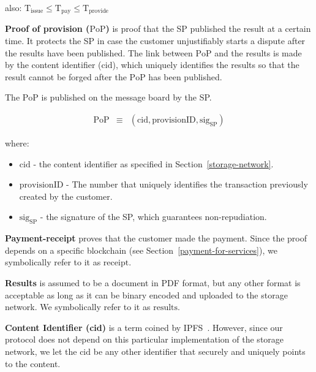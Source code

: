 \documentclass[pdftex,twocolumn,epjc3]{svjour3}
\begin{document}
{also:
\(\mathrm{T}_\mathrm{issue} \leq \mathrm{T}_\mathrm{pay} \leq \mathrm{T}_\mathrm{provide}\)


\noindent \textbf
{Proof of provision ($\mathrm{PoP}$)}\label{proof-of-provision} is proof that the SP published the result at a certain time. It protects the SP in case the customer unjustifiably starts a dispute after the results have been published. The link between $\mathrm{PoP}$ and the results is made by the content identifier ($\mathrm{cid}$), which uniquely identifies the results so that the result cannot be forged after the $\mathrm{PoP}$ has been published.

The $\mathrm{PoP}$ is published on the message board by the SP.


\begin{eqnarray}
\mathrm{PoP} & \equiv & (\mathrm{cid}, \mathrm{provisionID}, \mathrm{sig}_\mathrm{SP})
\end{eqnarray}

where:

\begin{itemize}

\item $\mathrm{cid}$ - the content identifier as specified in Section~\ref{storage-network}.
\item $\mathrm{provisionID}$ - The number that uniquely identifies the transaction previously created by the customer.
\item $\mathrm{sig}_\mathrm{SP}$ - the signature of the SP, which guarantees non-repudiation.
\end{itemize}

\noindent \textbf
{Payment-receipt}\label{payment-receipt} proves that the customer made the payment. Since the proof depends on a specific blockchain (see Section~\ref{payment-for-services}), we symbolically refer to it as $\mathrm{receipt}$.

\noindent \textbf
{Results}\label{results} is assumed to be a document in PDF format, but any other format is acceptable as long as it can be binary encoded and uploaded to the storage network. We symbolically refer to it as $\mathrm{results}$.

\noindent \textbf
{Content Identifier (cid)}\label{content-identifier-cid} is a term coined by IPFS~\cite{ipfsContentIdentifiersCIDs}. However, since our protocol does not depend on this particular implementation of the storage network, we let the $\mathrm{cid}$ be any other identifier that securely and uniquely points to the content.

}
\end{document}
